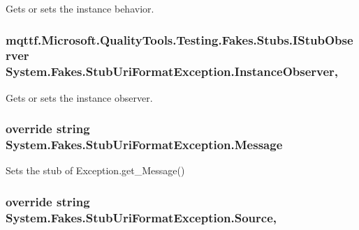 Gets or sets the instance behavior.

\hypertarget{class_system_1_1_fakes_1_1_stub_uri_format_exception_a16a86e73aaaac9553290c6840abf6350}{
\subsubsection[{Instance\-Observer}]{\setlength{\rightskip}{0pt plus 5cm}mqttf.\-Microsoft.\-Quality\-Tools.\-Testing.\-Fakes.\-Stubs.\-I\-Stub\-Observer System.\-Fakes.\-Stub\-Uri\-Format\-Exception.\-Instance\-Observer\hspace{0.3cm}{\ttfamily [get]}, {\ttfamily [set]}}}\label{class_system_1_1_fakes_1_1_stub_uri_format_exception_a16a86e73aaaac9553290c6840abf6350}


Gets or sets the instance observer.

\hypertarget{class_system_1_1_fakes_1_1_stub_uri_format_exception_acb2e9dea30fe1786716138d6002a8627}{
\subsubsection[{Message}]{\setlength{\rightskip}{0pt plus 5cm}override string System.\-Fakes.\-Stub\-Uri\-Format\-Exception.\-Message\hspace{0.3cm}{\ttfamily [get]}}}\label{class_system_1_1_fakes_1_1_stub_uri_format_exception_acb2e9dea30fe1786716138d6002a8627}


Sets the stub of Exception.\-get\-\_\-\-Message()

\hypertarget{class_system_1_1_fakes_1_1_stub_uri_format_exception_ae3d7b31ce7b5a7336d32fa193f94fc8e}{
\subsubsection[{Source}]{\setlength{\rightskip}{0pt plus 5cm}override string System.\-Fakes.\-Stub\-Uri\-Format\-Exception.\-Source\hspace{0.3cm}{\ttfamily [get]}, {\ttfamily [set]}}}\label{class_system_1_1_fakes_1_1_stub_uri_format_exception_ae3d7b31ce7b5a7336d32fa193f94fc8e}


